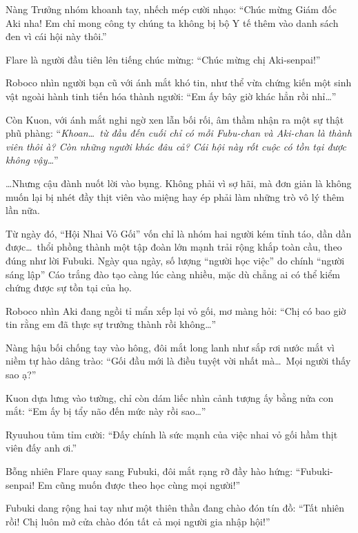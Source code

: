 \documentclass[../main.tex]{subfiles}
\begin{document}
Nàng Trưởng nhóm khoanh tay, nhếch mép cười nhạo: ``Chúc mừng Giám đốc Aki nha! Em chỉ mong công ty chúng ta không bị bộ Y tế thêm vào danh sách đen vì cái hội này thôi.''

Flare là người đầu tiên lên tiếng chúc mừng: ``Chúc mừng chị Aki-senpai!''

Roboco nhìn người bạn cũ với ánh mắt khó tin, như thể vừa chứng kiến một sinh vật ngoài hành tinh tiến hóa thành người: ``Em ấy bây giờ khác hẳn rồi nhỉ\dots''

Còn Kuon, với ánh mắt nghi ngờ xen lẫn bối rối, âm thầm nhận ra một sự thật phũ phàng: ``\textit{Khoan\dots\ từ đầu đến cuối chỉ có mỗi Fubu-chan và Aki-chan là thành viên thôi à? Còn những người khác đâu cả? Cái hội này rốt cuộc có tồn tại được không vậy\dots}''

\dots Nhưng cậu đành nuốt lời vào bụng. Không phải vì sợ hãi, mà đơn giản là không muốn lại bị nhét đầy thịt viên vào miệng hay ép phải làm những trò vô lý thêm lần nữa.


\omk

Từ ngày đó, ``Hội Nhai Vỏ Gối'' vốn chỉ là nhóm hai người kém tỉnh táo, dần dần được\dots\ thổi phồng thành một tập đoàn lớn mạnh trải rộng khắp toàn cầu, theo đúng như lời Fubuki. Ngày qua ngày, số lượng ``người học việc'' do chính ``người sáng lập'' Cáo trắng đào tạo càng lúc càng nhiều, mặc dù chẳng ai có thể kiểm chứng được sự tồn tại của họ.


Roboco nhìn Aki đang ngồi tỉ mẩn xếp lại vỏ gối, mơ màng hỏi: ``Chị có bao giờ tin rằng em đã thực sự trưởng thành rồi không\dots''

Nàng hậu bối chống tay vào hông, đôi mắt long lanh như sắp rơi nước mắt vì niềm tự hào dâng trào: ``Gối đầu mới là điều tuyệt vời nhất mà\dots\ Mọi người thấy sao ạ?''

Kuon dựa lưng vào tường, chỉ còn dám liếc nhìn cảnh tượng ấy bằng nửa con mắt: ``Em ấy bị tẩy não đến mức này rồi sao\dots''

Ryuuhou tủm tỉm cười: ``Đấy chính là sức mạnh của việc nhai vỏ gối hầm thịt viên đấy anh ơi.''

Bỗng nhiên Flare quay sang Fubuki, đôi mắt rạng rỡ đầy hào hứng: ``Fubuki-senpai! Em cũng muốn được theo học cùng mọi người!''

Fubuki dang rộng hai tay như một thiên thần đang chào đón tín đồ: ``Tất nhiên rồi! Chị luôn mở cửa chào đón tất cả mọi người gia nhập hội!''
\end{document}
